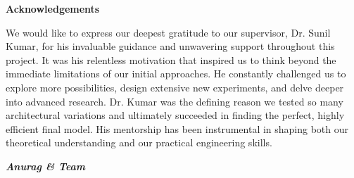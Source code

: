 \begin{center}
{\LARGE \bf Acknowledgements}
\end{center}

\vspace{1cm}

We would like to express our deepest gratitude to our supervisor, Dr. Sunil Kumar, for his invaluable guidance and unwavering support throughout this project. It was his relentless motivation that inspired us to think beyond the immediate limitations of our initial approaches. He constantly challenged us to explore more possibilities, design extensive new experiments, and delve deeper into advanced research. Dr. Kumar was the defining reason we tested so many architectural variations and ultimately succeeded in finding the perfect, highly efficient final model. His mentorship has been instrumental in shaping both our theoretical understanding and our practical engineering skills.

\vspace{1cm}
\begin{flushright}
\textit{\textbf{Anurag \& Team}}
\end{flushright}
